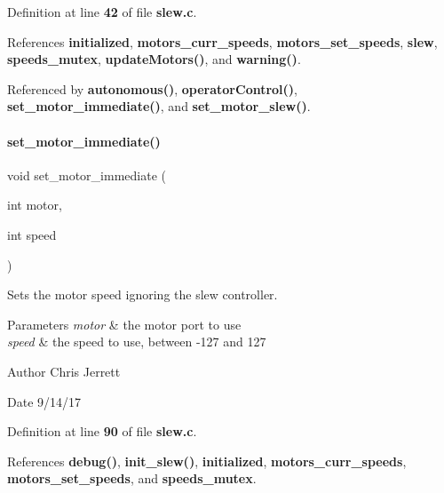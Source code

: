 Definition at line \textbf{ 42} of file \textbf{ slew.\+c}.



References \textbf{ initialized}, \textbf{ motors\+\_\+curr\+\_\+speeds}, \textbf{ motors\+\_\+set\+\_\+speeds}, \textbf{ slew}, \textbf{ speeds\+\_\+mutex}, \textbf{ update\+Motors()}, and \textbf{ warning()}.



Referenced by \textbf{ autonomous()}, \textbf{ operator\+Control()}, \textbf{ set\+\_\+motor\+\_\+immediate()}, and \textbf{ set\+\_\+motor\+\_\+slew()}.

\mbox{\label{slew_8c_a9f8b8ae577ef938622024545711f0151}} 
\paragraph{set\+\_\+motor\+\_\+immediate()}
{\footnotesize\ttfamily void set\+\_\+motor\+\_\+immediate (\begin{DoxyParamCaption}\item[{int}]{motor,  }\item[{int}]{speed }\end{DoxyParamCaption})}



Sets the motor speed ignoring the slew controller. 


\begin{DoxyParams}{Parameters}
{\em motor} & the motor port to use \\
\hline
{\em speed} & the speed to use, between -\/127 and 127 \\
\hline
\end{DoxyParams}
\begin{DoxyAuthor}{Author}
Chris Jerrett 
\end{DoxyAuthor}
\begin{DoxyDate}{Date}
9/14/17 
\end{DoxyDate}


Definition at line \textbf{ 90} of file \textbf{ slew.\+c}.



References \textbf{ debug()}, \textbf{ init\+\_\+slew()}, \textbf{ initialized}, \textbf{ motors\+\_\+curr\+\_\+speeds}, \textbf{ motors\+\_\+set\+\_\+speeds}, and \textbf{ speeds\+\_\+mutex}.



